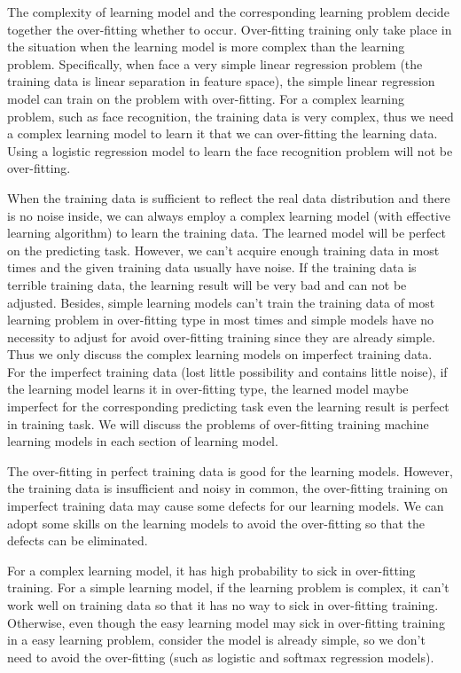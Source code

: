 \documentclass[runningheads,openany]{xhlPaper}
\begin{document}
The complexity of learning model and the corresponding learning problem decide together the over-fitting whether to occur. Over-fitting training only take place in the situation when the learning model is more complex than the learning problem. 
Specifically, when face a very simple linear regression problem (the training data is linear separation in feature space), the simple linear regression model can train on the problem with over-fitting. For a complex learning problem, such as face recognition, the training data is very complex, thus we need a complex learning model to learn it that we can over-fitting the learning data. Using a logistic regression model to learn the face recognition problem will not be over-fitting.   

When the training data is sufficient to reflect the real data distribution and there is no noise inside, we can always employ a complex learning model (with effective learning algorithm) to learn the training data. The learned model will be perfect on the predicting task.
However, we can't acquire enough training data in most times and the given training data usually have noise.
If the training data is terrible training data, the learning result will be very bad and can not be adjusted. 
Besides, simple learning models can't train the training data of most learning problem in over-fitting type in most times and simple models have no necessity to adjust for avoid over-fitting training since they are already simple. 
Thus we only discuss the complex learning models on imperfect training data.
For the imperfect training data (lost little possibility and contains little noise), if the learning model learns it in over-fitting type, the learned model maybe imperfect for the corresponding predicting task even the learning result is perfect in training task.
We will discuss the problems of over-fitting training machine learning models in each section of learning model.

The over-fitting in perfect training data is good for the learning models. 
However, the training data is insufficient and noisy in common, the over-fitting training on imperfect training data may cause some defects for our learning models. We can adopt some skills on the learning models to avoid the over-fitting so that the defects can be eliminated.

For a complex learning model, it has high probability to sick in over-fitting training. 
For a simple learning model, if the learning problem is complex, it can't work well on training data so that it has no way to sick in over-fitting training. Otherwise, even though the easy learning model may sick in over-fitting training in a easy learning problem, consider the model is already simple, so we don't need to avoid the over-fitting (such as logistic and softmax regression models).
\end{document}
